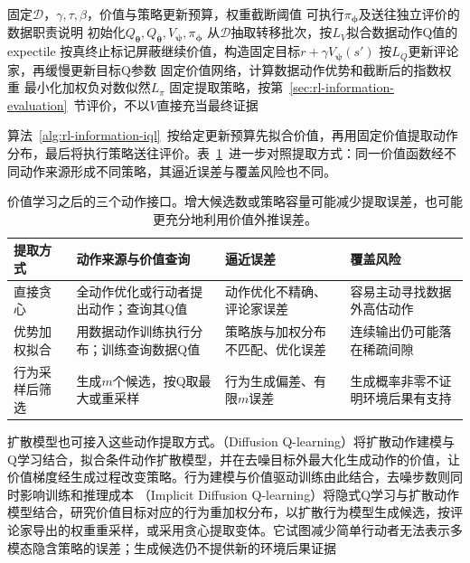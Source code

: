 \begin{algorithm}[固定经验上的IQL与策略提取]
  \label{alg:rl-information-iql}
  \begin{algorithmic}[1]
    \Require 固定$\mathcal D$，$\gamma,\tau,\beta$，价值与策略更新预算，权重截断阈值
    \Ensure 可执行$\pi_{\bm\phi}$及送往独立评价的数据职责说明
    \State 初始化$Q_{\bm\theta},Q_{\bar{\bm\theta}},V_{\bm\psi},\pi_{\bm\phi}$
      \State 从$\mathcal D$抽取转移批次，按$L_V$拟合数据动作Q值的expectile
      \State 按真终止标记屏蔽继续价值，构造固定目标$r+\gamma V_{\bm\psi}(s')$
      \State 按$L_Q$更新评论家，再缓慢更新目标Q参数
    \EndFor
      \State 固定价值网络，计算数据动作优势和截断后的指数权重
      \State 最小化加权负对数似然$L_\pi$
    \EndFor
    \State 固定提取策略，按第~\ref{sec:rl-information-evaluation}~节评价，不以$V$直接充当最终证据
  \end{algorithmic}
\end{algorithm}

算法~\ref{alg:rl-information-iql}~按给定更新预算先拟合价值，再用固定价值提取动作分布，最后将执行策略送往评价。表~\ref{tab:rl-information-extraction}~进一步对照提取方式：同一价值函数经不同动作来源形成不同策略，其逼近误差与覆盖风险也不同。

\begin{table}[htbp]
  \centering
  \small
  \begin{tabularx}{\linewidth}{p{26mm}XXX}
    \toprule
    提取方式 & 动作来源与价值查询 & 逼近误差 & 覆盖风险 \\
    \midrule
    直接贪心 & 全动作优化或行动者提出动作；查询其Q值 & 动作优化不精确、评论家误差 & 容易主动寻找数据外高估动作 \\
    优势加权拟合 & 用数据动作训练执行分布；训练查询数据Q值 & 策略族与加权分布不匹配、优化误差 & 连续输出仍可能落在稀疏间隙 \\
    行为采样后筛选 & 生成$m$个候选，按Q取最大或重采样 & 行为生成偏差、有限$m$误差 & 生成概率非零不证明环境后果有支持 \\
    \bottomrule
  \end{tabularx}
  \caption{价值学习之后的三个动作接口。增大候选数或策略容量可能减少提取误差，也可能更充分地利用价值外推误差。}
  \label{tab:rl-information-extraction}
\end{table}

扩散模型也可接入这些动作提取方式。（Diffusion Q-learning）将扩散动作建模与Q学习结合，拟合条件动作扩散模型，并在去噪目标外最大化生成动作的价值，让价值梯度经生成过程改变策略。行为建模与价值驱动训练由此结合，去噪步数则同时影响训练和推理成本
（Implicit Diffusion Q-learning）将隐式Q学习与扩散动作模型结合，研究价值目标对应的行为重加权分布，以扩散行为模型生成候选，按评论家导出的权重重采样，或采用贪心提取变体。它试图减少简单行动者无法表示多模态隐含策略的误差；生成候选仍不提供新的环境后果证据

